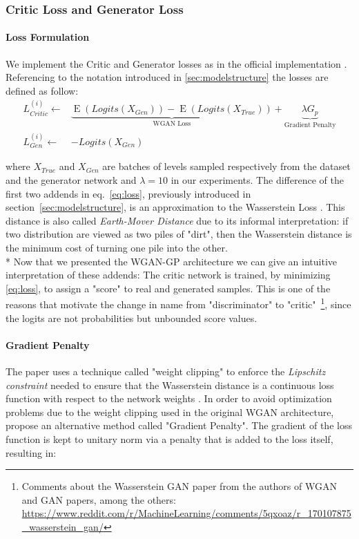 \subsubsection{Critic Loss and Generator Loss}
\paragraph{Loss Formulation}
We implement the Critic and Generator losses as in the  official implementation \cite{wgangp-imple}. Referencing to the notation introduced in \ref{sec:modelstructure} the losses are defined as follow:
\begin{equation}
\label{eq:loss}
 \begin{split}
L_{Critic}^{(i)} \gets & \underbrace{\operatorname{E}(Logits(X_{Gen})) - \operatorname{E}(Logits(X_{True}))}_{\text{WGAN Loss}} + \underbrace {\lambda G_p}_{\text{Gradient Penalty}} \\
L_{Gen}^{(i)} \gets & -Logits(X_{Gen}) 
\end{split}
\end{equation}

where $X_{True}$ and $X_{Gen}$ are batches of levels sampled respectively from the dataset and the generator network and $\lambda = 10$ in our experiments.
The difference of the first two addends in eq.~\ref{eq:loss}, previously introduced in section~\ref{sec:modelstructure}, is an approximation to the Wasserstein Loss \cite[\S~3]{wgan}. This distance is also called \textit{Earth-Mover Distance} due to its informal interpretation: if two distribution are viewed as two piles of "dirt", then the Wasserstein distance is the minimum cost of turning one pile into the other. \\*
Now that we presented the WGAN-GP architecture we can give an intuitive interpretation of these addends: The critic network is trained, by minimizing \ref{eq:loss}, to assign a "score" to real and generated samples. This is one of the reasons that motivate the change in name from "discriminator" to "critic"~\footnote{ Comments about the Wasserstein GAN paper from the authors of WGAN and GAN papers, among the others: \url{https://www.reddit.com/r/MachineLearning/comments/5qxoaz/r_170107875_wasserstein_gan/}}, since the logits are not probabilities but unbounded score values.

\paragraph{Gradient Penalty} The  paper uses a technique called "weight clipping" to enforce the \textit{Lipschitz constraint} needed to ensure that the Wasserstein distance is a continuous loss function with respect to the network weights \cite[\S2]{wgan}. In order to avoid optimization problems due to the weight clipping used in the original WGAN architecture, \cite{wgangp} propose an alternative method called "Gradient Penalty". The gradient of the loss function is kept to unitary norm via a penalty that is added to the loss itself, resulting in:

